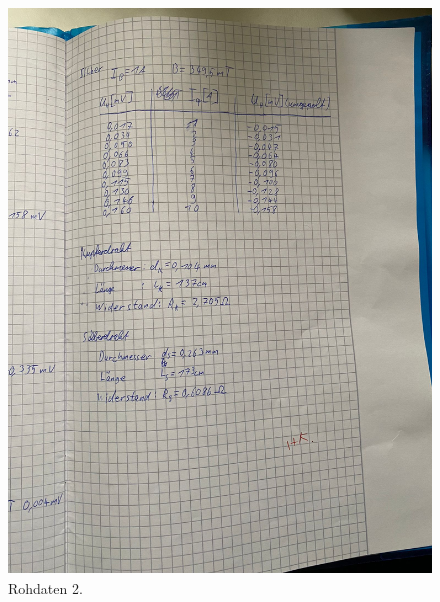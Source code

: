\begin{figure}[H]
  \includegraphics[width=\textwidth, height=15cm]{Bilder/data2.jpg}
  \caption{Rohdaten 2.}
\end{figure}



